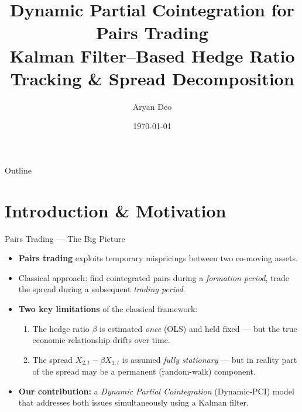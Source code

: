 \documentclass[10pt, aspectratio=169]{beamer}
\title[Dynamic-PCI Pairs Trading]{%
  Dynamic Partial Cointegration for Pairs Trading\\[4pt]
  \large Kalman Filter--Based Hedge Ratio Tracking \& Spread Decomposition}
\author{Aryan Deo}
\institute{Undergraduate Project (UGP)}
\date{\today}
\begin{document}
\begin{frame}
  \titlepage
\end{frame}

\begin{frame}{Outline}
  \tableofcontents
\end{frame}

\section{Introduction \& Motivation}

\begin{frame}{Pairs Trading --- The Big Picture}
  \begin{itemize}
    \item \textbf{Pairs trading} exploits temporary mispricings between two
          co-moving assets.
    \item Classical approach: find cointegrated pairs during a
          \emph{formation period}, trade the spread during a subsequent
          \emph{trading period}.
    \item \textbf{Two key limitations} of the classical framework:
    \begin{enumerate}
      \item The hedge ratio $\beta$ is estimated \emph{once} (OLS) and held
            fixed --- but the true economic relationship drifts over time.
      \item The spread $X_{2,t} - \beta X_{1,t}$ is assumed \emph{fully
            stationary} --- but in reality part of the spread may be a
            permanent (random-walk) component.
    \end{enumerate}
    \item \textbf{Our contribution:} a \emph{Dynamic Partial Cointegration}
          (Dynamic-PCI) model that addresses both issues simultaneously
          using a Kalman filter.
  \end{itemize}
\end{frame}
\end{document}
